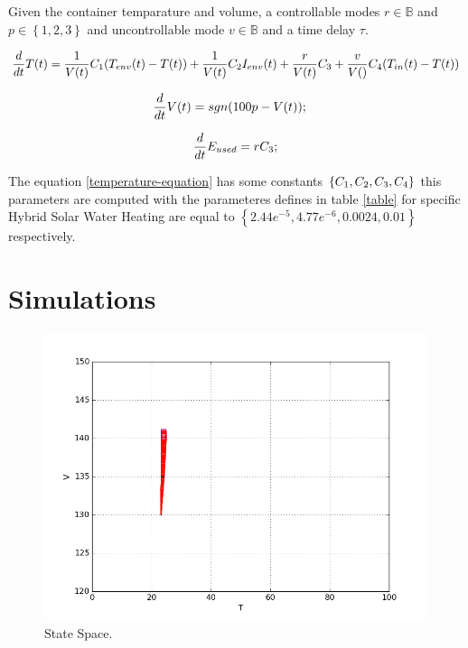 \documentclass[a4paper,12pt]{book}
\begin{document}
    Given the container temparature and volume, a controllable modes $r \in \mathbb{B}$
    and $p \in \left\lbrace1,2,3\right\rbrace $ and uncontrollable mode
    $v \in \mathbb{B} $ and a time delay $\tau$.


    
    \begin{equation}
    \frac{d}{dt}T(t) =   \frac{1}{V(t)}  C_1(T_{env}(t)-T(t))+ \frac{1}{V(t)} C_{2}I_{env}(t)+  \frac{r}{V(t)} C_{3} +  \frac{v}{V()} C_{4}(T_{in}(t)-T(t))
    \label{temperature-equation}
    \end{equation}

    \begin{equation}
    \frac{d}{dt}V(t) = sgn(100p - V(t)); \quad
    \label{volume-equation}
    \end{equation}

    \begin{equation} 
    \frac{d}{dt}E_{used} =  r C_{3} ;
    \label{Energy-equation}
    \end{equation}

    The equation \ref{temperature-equation} has some constants $\left\lbrace 
    C_1, C_{2}, C_{3}, C_{4} \right\rbrace $ this
    parameters are computed with the parameteres defines in table \ref{table} for specific Hybrid Solar Water Heating
    are equal to $\left\lbrace 2.44e^{-5},  4.77e^{-6}
    , 0.0024, 0.01  \right\rbrace$ respectively.


    \section{Simulations}


    \begin{figure}
        \includegraphics[width=\linewidth]{1.png}
        \caption{State Space.}
        \label{fig:1}
    \end{figure}
\end{document}
